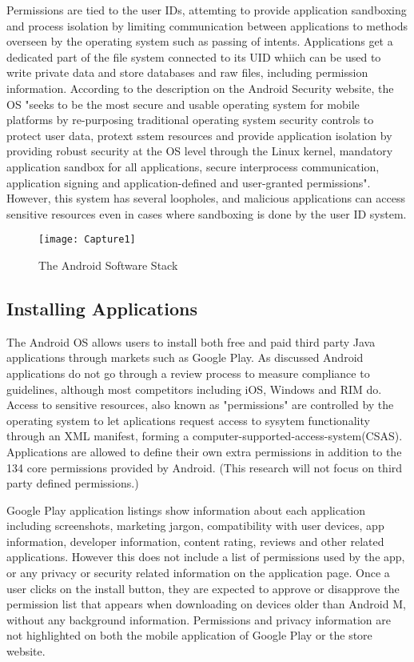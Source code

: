 Permissions are tied to the user IDs, attemting to provide application sandboxing and process isolation by limiting communication between applications to methods overseen by the operating system such as passing of intents. Applications get a dedicated part of the file system connected to its UID whiich can be used to write private data and store databases and raw files, including permission information. According to the description on the Android Security website, the OS "seeks to be the most secure and usable operating system for mobile platforms by re-purposing traditional operating system security controls to protect user data, protext sstem resources and provide application isolation by providing robust security at the OS level through the Linux kernel, mandatory application sandbox for all applications, secure interprocess communication, application signing and application-defined and user-granted permissions"\cite{diagrameka}. However, this system has several loopholes, and malicious applications can access sensitive resources even in cases where sandboxing is done by the user ID system\cite{meshram2014survey}. 
\smallskip
\begin{figure}
\texttt{[image: Capture1]}
\caption{The Android Software Stack}
\end{figure}
\smallskip

\subsection{Installing Applications}
The Android OS allows users to install both free and paid third party Java applications through markets such as Google Play. As discussed Android applications do not go through a review process to measure compliance to guidelines, although most competitors including iOS, Windows and RIM do. Access to sensitive resources, also known as "permissions" are controlled by the operating system to let aplications request access to sysytem functionality through an XML manifest, forming a computer-supported-access-system(CSAS)\cite{stevens2009computer}. Applications are allowed to define their own extra permissions in addition to the 134 core permissions provided by Android\cite{a}. (This research will not focus on third party defined permissions.)
\smallskip

Google Play application listings show information about each application including screenshots, marketing jargon, compatibility with user devices, app information, developer information, content rating, reviews and other related applications. However this does not include a list of permissions used by the app, or any privacy or security related information on the application page. Once a user clicks on the install button, they are expected to approve or disapprove the permission list that appears when downloading on devices older than Android M, without any background information. Permissions and privacy information are not highlighted on both the mobile application of Google Play or the store website\cite{kelley2013privacy}. 

